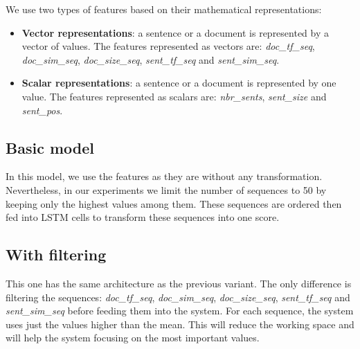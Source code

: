 \documentclass[12pt, oneside, a4paper]{article}
\begin{document}
We use two types of features based on their mathematical representations: 
\begin{itemize}
	\item \textbf{Vector representations}: a sentence or a document is represented by a vector of values. 
	The features represented as vectors are: \textit{doc\_tf\_seq}, \textit{doc\_sim\_seq}, \textit{doc\_size\_seq}, \textit{sent\_tf\_seq} and \textit{sent\_sim\_seq}.
	\item \textbf{Scalar representations}: a sentence or a document is represented by one value. 
	The features represented as scalars are: \textit{nbr\_sents}, \textit{sent\_size} and \textit{sent\_pos}.
\end{itemize}

\subsection{Basic model}

In this model, we use the features as they are without any transformation. 
Nevertheless, in our experiments we limit the number of sequences to 50 by keeping only the highest values among them. 
These sequences are ordered then fed into LSTM cells to transform these sequences into one score.
%
%	

\subsection{With filtering}

This one has the same architecture as the previous variant. 
The only difference is filtering the sequences: \textit{doc\_tf\_seq}, \textit{doc\_sim\_seq}, \textit{doc\_size\_seq}, \textit{sent\_tf\_seq} and \textit{sent\_sim\_seq} before feeding them into the system. 
For each sequence, the system uses just the values higher than the mean. 
This will reduce the working space and will help the system focusing on the most important values.
\end{document}
